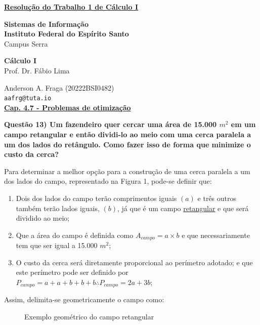 \documentclass{article}
\begin{document}
\underline{\textbf{Resolução do Trabalho 1 de Cálculo I}}\par
\textbf{Sistemas de Informação}\\
\textbf{Instituto Federal do Espírito Santo}\\
Campus Serra\par
\textbf{Cálculo I}\\
Prof. Dr. Fábio Lima\par
Anderson A. Fraga (20222BSI0482)\\
\texttt{aafrg@tuta.io}\\  %

\noindent \underline{\textbf{Cap. 4.7 - Problemas de otimização}}\par
\noindent \textbf{Questão 13) Um fazendeiro quer cercar uma área de 15.000 $m^2$ em um campo retangular e então dividi-lo ao meio com uma cerca paralela a um dos lados do retângulo. Como fazer isso de forma que minimize o custo da cerca?}\par
Para determinar a melhor opção para a construção de uma cerca paralela a um dos lados do campo, representado na Figura 1, pode-se definir que:
\begin{enumerate}[label=(\roman*)]
    \item Dois dos lados do campo terão comprimentos iguais $(a)$ e três outros também terão lados iguais, $(b)$, já que é um campo \underline{retangular} e que será dividido ao meio;
    \item Que a área do campo é definida como $A_{campo} = a \times b$ e que necessariamente tem que ser igual a 15.000 $m^2$;
    \item O custo da cerca será diretamente proporcional ao perímetro adotado; e que este perímetro pode ser definido por $P_{campo} = a + a + b + b + b \therefore P_{campo} = 2a + 3b$;
\end{enumerate}
Assim, delimita-se geometricamente o campo como:
\begin{figure}[!h] %
    \centering
    \caption{Exemplo geométrico do campo retangular}
\end{figure}
\end{document}
